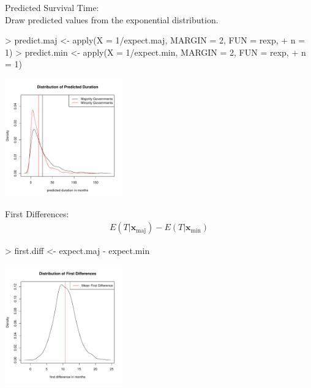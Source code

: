 \documentclass{beamer}
\begin{document}
\begin{frame}[fragile]
\normalsize
Predicted Survival Time:\\
\pause
\bigskip
Draw predicted values from the exponential distribution.
\pause
\tiny
\begin{Schunk}
\begin{Sinput}
> predict.maj <- apply(X = 1/expect.maj, MARGIN = 2, FUN = rexp, 
+     n = 1)
> predict.min <- apply(X = 1/expect.min, MARGIN = 2, FUN = rexp, 
+     n = 1)
\end{Sinput}
\end{Schunk}
\pause
\begin{center}
\includegraphics[width = 2in, height = 2in]{survival_present-predicted.pdf}
\end{center}

\end{frame}

\begin{frame}[fragile]
\normalsize
First Differences:
\pause
\begin{eqnarray*}
E(T | \mathbf{x}_\mathrm{maj}) - E(T | \mathbf{x}_\mathrm{min})
\end{eqnarray*}
\pause
\tiny
\begin{Schunk}
\begin{Sinput}
> first.diff <- expect.maj - expect.min
\end{Sinput}
\end{Schunk}
\pause
\begin{center}
\includegraphics[width = 2in, height = 2in]{survival_present-fd.pdf}
\end{center}

\end{frame}
\end{document}
